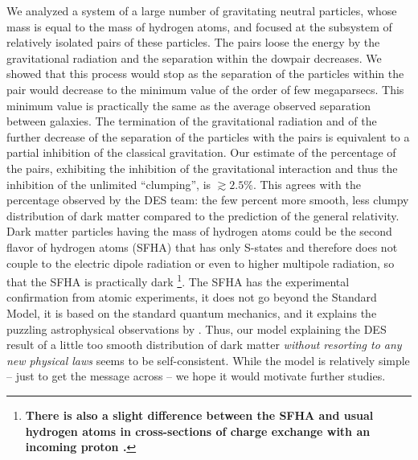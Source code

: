 \documentclass[referee]{raa}            %
\begin{document}
We analyzed a system of a large number of gravitating neutral particles, whose mass is equal to the mass of hydrogen atoms, and focused at the subsystem of relatively isolated pairs of these particles. The pairs loose the energy by the gravitational radiation and the separation within the dowpair decreases. We showed that this process would stop as the separation of the particles within the pair would decrease to the minimum value of the order of few megaparsecs. This minimum value is practically the same as the average observed separation between galaxies.
The termination of the gravitational radiation and of the further decrease of the separation of the particles with the pairs is equivalent to a partial inhibition of the classical gravitation. Our estimate of the percentage of the pairs, exhibiting the inhibition of the gravitational interaction and thus the inhibition of the unlimited “clumping”, is $\gtrsim 2.5\%$. This agrees with the percentage observed by the DES team: the few percent more smooth, less clumpy distribution of dark matter compared to the prediction of the general relativity.
Dark matter particles having the mass of hydrogen atoms could be the second flavor of hydrogen atoms (SFHA) that has only S-states and therefore does not couple to the electric dipole radiation or even to higher multipole radiation, so that the SFHA is practically dark \footnote{\textbf{There is also a slight difference between the SFHA and usual hydrogen atoms in cross-sections of
	charge exchange with an incoming proton \citealt{Oks+2021}.}}. The 
SFHA has the experimental confirmation from atomic experiments, it does not go beyond the 
Standard Model, it is based on the standard quantum mechanics, and it explains the puzzling astrophysical observations by \cite{Bowman+etal+2018}. Thus, our model explaining the DES result of a little too smooth distribution of dark matter \textit{without resorting to any new physical laws} seems to be self-consistent. While the model is relatively simple – just to get the message across – we hope it would motivate further studies.

	
	\appendix                  %
\end{document}
